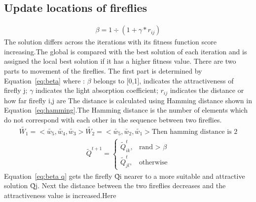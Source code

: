 \documentclass{nitk}
\begin{document}
\subsection{Update locations of fireflies}
\begin{equation}
\label{eq:beta}
\begin{aligned}
\beta = 1 \div (1 + \gamma * r_{ij})
\end{aligned}
\end{equation}
The solution differs across the iterations with its fitness function score increasing.The global is compared with the best solution of each iteration and is assigned the local best solution if it has a higher fitness value.
There are two parts to movement of the fireflies.
The first part is determined by Equation~\ref{eq:beta} where :
\newline
$\beta$ belongs to [0,1], indicates the attractiveness of firefly j;
\newline
$\gamma$ indicates the light absorption coefficient;
\newline
$r_{ij}$ indicates the distance or how far firefly i,j are
\newline
The distance is calculated using Hamming distance shown in Equation~\ref{eq:hamming}.The Hamming
distance is the number of elements which do not correspond with each other in the sequence between two fireflies.
\begin{equation}
\label{eq:hamming}
\begin{aligned}
\tilde{W_1} = < \tilde{w_5},\tilde{w_4},\tilde{w_3} >
\tilde{W_2} = <\tilde{w_5},\tilde{w_2},\tilde{w_1}>
\text{Then hamming distance is 2} 
\end{aligned}
\end{equation}
\begin{equation}
\label{eq:beta q}
\begin{aligned}
    \tilde{Q}^{t+1}= 
    \begin{cases}
    \tilde{Q}_{ik}^t, &\text{rand > } \beta \\
    \tilde{Q}_{jl}^t, &\text{otherwise}    
    \end{cases}    
\end{aligned}
\end{equation}
Equation~\ref{eq:beta q} gets the firefly \~{Qi} nearer to a more suitable and attractive solution \~{Qj}. Next the distance between the two fireflies decreases and the attractiveness value is increased.Here
\newline
\newline
\end{document}

